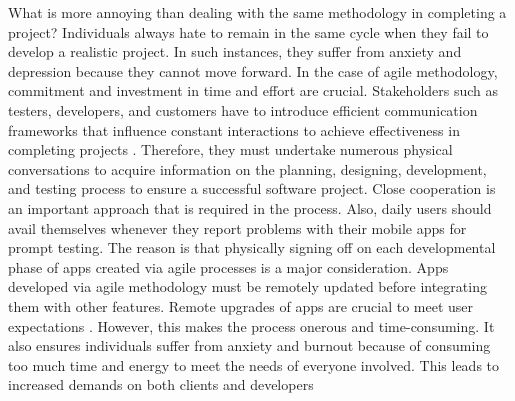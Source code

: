 \documentclass{article}
\begin{document}
What is more annoying than dealing with the same methodology in completing a project? Individuals always hate to remain in the same cycle when they fail to develop a realistic project. In such instances, they suffer from anxiety and depression because they cannot move forward. In the case of agile methodology, commitment and investment in time and effort are crucial. Stakeholders such as testers, developers, and customers have to introduce efficient communication frameworks that influence constant interactions to achieve effectiveness in completing projects \cite{ciricReference}. Therefore, they must undertake numerous physical conversations to acquire information on the planning, designing, development, and testing process to ensure a successful software project. Close cooperation is an important approach that is required in the process. Also, daily users should avail themselves whenever they report problems with their mobile apps for prompt testing. The reason is that physically signing off on each developmental phase of apps created via agile processes is a major consideration. Apps developed via agile methodology must be remotely updated before integrating them with other features. Remote upgrades of apps are crucial to meet user expectations \cite{HODA201760}. However, this makes the process onerous and time-consuming. It also ensures individuals suffer from anxiety and burnout because of consuming too much time and energy to meet the needs of everyone involved. 
This leads to increased demands on both clients and developers
\end{document}
